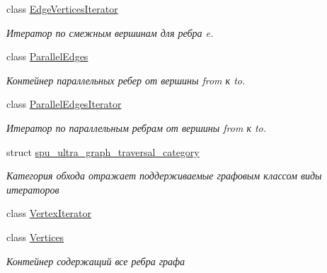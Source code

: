 \begin{DoxyCompactItemize}
class \hyperlink{class_s_p_u___g_r_a_p_h_1_1_spu_ultra_graph_1_1_edge_vertices_iterator}{Edge\+Vertices\+Iterator}
\begin{DoxyCompactList}\small\item\em Итератор по смежным вершинам для ребра e. \end{DoxyCompactList}\item 
class \hyperlink{class_s_p_u___g_r_a_p_h_1_1_spu_ultra_graph_1_1_parallel_edges}{Parallel\+Edges}
\begin{DoxyCompactList}\small\item\em Контейнер параллельных ребер от вершины from к to. \end{DoxyCompactList}\item 
class \hyperlink{class_s_p_u___g_r_a_p_h_1_1_spu_ultra_graph_1_1_parallel_edges_iterator}{Parallel\+Edges\+Iterator}
\begin{DoxyCompactList}\small\item\em Итератор по параллельным ребрам от вершины from к to. \end{DoxyCompactList}\item 
struct \hyperlink{struct_s_p_u___g_r_a_p_h_1_1_spu_ultra_graph_1_1spu__ultra__graph__traversal__category}{spu\+\_\+ultra\+\_\+graph\+\_\+traversal\+\_\+category}
\begin{DoxyCompactList}\small\item\em Категория обхода отражает поддерживаемые графовым классом виды итераторов \end{DoxyCompactList}\item 
class \hyperlink{class_s_p_u___g_r_a_p_h_1_1_spu_ultra_graph_1_1_vertex_iterator}{Vertex\+Iterator}
\item 
class \hyperlink{class_s_p_u___g_r_a_p_h_1_1_spu_ultra_graph_1_1_vertices}{Vertices}
\begin{DoxyCompactList}\small\item\em Контейнер содержащий все ребра графа \end{DoxyCompactList}\end{DoxyCompactItemize}
